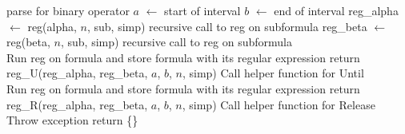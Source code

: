 \documentclass[runningheads]{llncs}
\begin{document}
\begin{algorithm}[H]
\begin{algorithmic}
        \Comment parse for binary operator
        \State $a$ $\leftarrow$ start of interval
        \State $b$ $\leftarrow$ end of interval
        \State reg\_alpha $\leftarrow$ reg(alpha, $n$, sub, simp)
        \Comment recursive call to reg on subformula
        \State reg\_beta $\leftarrow$ reg(beta, $n$, sub, simp)
        \Comment recursive call to reg on subformula
        \\
                \State Run reg on formula and store formula with its regular expression
            \EndIf
            \State return reg\_U(reg\_alpha, reg\_beta, $a$, $b$, $n$, simp)
            \Comment Call helper function for Until\\
                \State Run reg on formula and store formula with its regular expression
            \EndIf
            \State return reg\_R(reg\_alpha, reg\_beta, $a$, $b$, $n$, simp)
            \Comment Call helper function for Release
        \EndIf
    \EndIf\\
    \State Throw exception 
    \State return \{\}
\EndProcedure
\end{algorithmic}
\end{algorithm}
\end{document}

